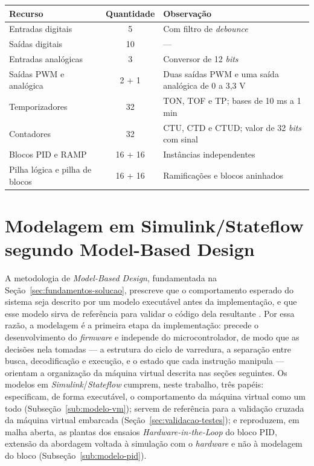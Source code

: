 \begin{quadrofixo}
    \centering
    \begin{tabular}{|l|c|p{7.2cm}|}
        \hline
        Recurso & Quantidade & Observação \\
        \hline
        Entradas digitais & 5 & Com filtro de \textit{debounce} \\
        \hline
        Saídas digitais & 10 & --- \\
        \hline
        Entradas analógicas & 3 & Conversor de 12 \textit{bits} \\
        \hline
        Saídas PWM e analógica & 2 + 1 & Duas saídas PWM e uma saída analógica de 0 a 3,3 V \\
        \hline
        Temporizadores & 32 & TON, TOF e TP; bases de 10 ms a 1 min \\
        \hline
        Contadores & 32 & CTU, CTD e CTUD; valor de 32 \textit{bits} com sinal \\
        \hline
        Blocos PID e RAMP & 16 + 16 & Instâncias independentes \\
        \hline
        Pilha lógica e pilha de blocos & 16 + 16 & Ramificações e blocos aninhados \\
        \hline
    \end{tabular}

    \label{qua:recursos}
\end{quadrofixo}


\section{Modelagem em Simulink/Stateflow segundo Model-Based Design}
\label{sec:stateflow-mbd}

A metodologia de \textit{Model-Based Design}, fundamentada na Seção~\ref{sec:fundamentos-solucao}, prescreve que o comportamento esperado do sistema seja descrito por um modelo executável antes da implementação, e que esse modelo sirva de referência para validar o código dela resultante \cite{nicolescu:2009}.
Por essa razão, a modelagem é a primeira etapa da implementação: precede o desenvolvimento do \textit{firmware} e independe do microcontrolador, de modo que as decisões nela tomadas --- a estrutura do ciclo de varredura, a separação entre busca, decodificação e execução, e o estado que cada instrução manipula --- orientam a organização da máquina virtual descrita nas seções seguintes.
Os modelos em \textit{Simulink}/\textit{Stateflow} cumprem, neste trabalho, três papéis: especificam, de forma executável, o comportamento da máquina virtual como um todo (Subseção~\ref{sub:modelo-vm}); servem de referência para a validação cruzada da máquina virtual embarcada (Seção~\ref{sec:validacao-testes}); e reproduzem, em malha aberta, as plantas dos ensaios \textit{Hardware-in-the-Loop} do bloco PID, extensão da abordagem voltada à simulação com o \textit{hardware} e não à modelagem do bloco (Subseção~\ref{sub:modelo-pid}).


